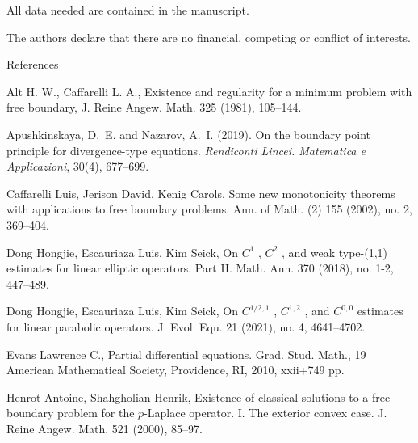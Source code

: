 \documentclass[11pt,reqno]{amsart}
\theoremstyle{plain}
\theoremstyle{remark}
\numberwithin{equation}{section}
\begin{document}
 All data needed are contained in the manuscript.

\medskip
{} The authors declare that there are no financial, competing or conflict of interests. 



\begin{thebibliography}{References}



Alt H. W., Caffarelli L. A.,
 Existence and regularity for a minimum problem with free boundary,
J. Reine Angew. Math. 325 (1981), 105–144.

Apushkinskaya, D.~E. and Nazarov, A.~I. (2019).
\newblock On the boundary point principle for divergence-type equations.
\newblock \textit{Rendiconti Lincei. Matematica e Applicazioni}, 30(4), 677--699.


Caffarelli Luis, Jerison David, Kenig Carols,
Some new monotonicity theorems with applications to free boundary problems. 
Ann. of Math. (2) 155 (2002), no. 2, 369–404.



Dong Hongjie, Escauriaza Luis, Kim Seick,
On  $C^1$ ,  $C^2$ , and weak type-(1,1)  estimates for linear elliptic operators. Part II.
Math. Ann. 370 (2018), no. 1-2, 447–489.

Dong Hongjie, Escauriaza Luis, Kim Seick,
 On  $C^{1/2,1}$ ,  $C^{1,2}$ , and  $C^{0,0}$  estimates for linear parabolic operators.
J. Evol. Equ. 21 (2021), no. 4, 4641–4702.

Evans Lawrence C.,
Partial differential equations.
Grad. Stud. Math., 19
American Mathematical Society, Providence, RI, 2010, xxii+749 pp.


Henrot Antoine, Shahgholian Henrik,
 Existence of classical solutions to a free boundary problem for the $p$-Laplace operator. I. The exterior convex case.
J. Reine Angew. Math. 521 (2000), 85–97.



\end{thebibliography}
\end{document}
